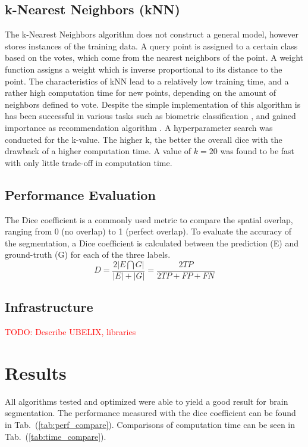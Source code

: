 \documentclass[journal]{IEEEtran}
\newcommand\TODO[1]{\textcolor{red}{TODO: #1}}
\begin{document}
\subsection{k-Nearest Neighbors (kNN)}
The k-Nearest Neighbors algorithm does not construct a general model, however stores instances of the training data. A query point is assigned to a certain class based on the votes, which come from the nearest neighbors of the point. A weight function assigns a weight which is inverse proportional to its distance to the point. The characteristics of kNN lead to a relatively low training time, and a rather high computation time for new points, depending on the amount of neighbors defined to vote. Despite the simple implementation of this algorithm is has been successful in various tasks such as biometric classification \cite{Dhriti2012}, and gained importance as recommendation algorithm \cite{Sarwar2001}. A hyperparameter search was conducted for the k-value. The higher k, the better the overall dice with the drawback of a higher computation time. A value of $k=20$ was found to be fast with only little trade-off in computation time.


\subsection{Performance Evaluation}\label{ch.eval}
The Dice coefficient is a commonly used metric to compare the spatial overlap, ranging from 0 (no overlap) to 1 (perfect overlap). To evaluate the accuracy of the segmentation, a Dice coefficient is calculated between the prediction (E) and ground-truth (G) for each of the three labels. 
\begin{equation}
D = \frac{2|E \bigcap G|}{|E| + |G|} = \frac{2 TP}{2 TP + FP + FN}
\end{equation}

\subsection{Infrastructure}
\TODO{Describe UBELIX, libraries}


\section{Results}
All algorithms tested and optimized were able to yield a good result for brain segmentation. The performance measured with the dice coefficient can be found in Tab.~(\ref{tab:perf_compare}). Comparisons of computation time can be seen in Tab.~(\ref{tab:time_compare}).\\
\end{document}
